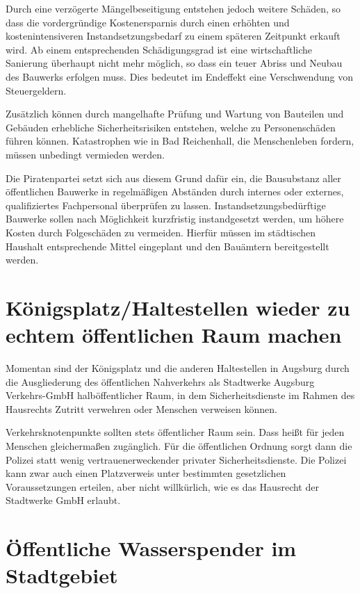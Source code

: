   Durch eine verzögerte Mängelbeseitigung entstehen jedoch weitere Schäden, so 
  dass die vordergründige Kostenersparnis durch einen erhöhten und 
  kostenintensiveren Instandsetzungsbedarf zu einem späteren Zeitpunkt erkauft 
  wird. Ab einem entsprechenden Schädigungsgrad ist eine wirtschaftliche 
  Sanierung überhaupt nicht mehr möglich, so dass ein teuer Abriss und Neubau 
  des Bauwerks erfolgen muss. Dies bedeutet im Endeffekt eine Verschwendung 
  von Steuergeldern.
  
  Zusätzlich können durch mangelhafte Prüfung und Wartung von Bauteilen und 
  Gebäuden erhebliche Sicherheitsrisiken entstehen, welche zu Personenschäden 
  führen können. Katastrophen wie in Bad Reichenhall, die Menschenleben 
  fordern, müssen unbedingt vermieden werden.
  
  Die Piratenpartei setzt sich aus diesem Grund dafür ein, die Bausubstanz 
  aller öffentlichen Bauwerke in regelmäßigen Abständen durch internes oder 
  externes, qualifiziertes Fachpersonal überprüfen zu lassen. 
  Instandsetzungsbedürftige Bauwerke sollen nach Möglichkeit kurzfristig 
  instandgesetzt werden, um höhere Kosten durch Folgeschäden zu vermeiden. 
  Hierfür müssen im städtischen Haushalt entsprechende Mittel eingeplant und 
  den Bauämtern bereitgestellt werden.
  
  \section{Königsplatz/Haltestellen wieder zu echtem öffentlichen Raum machen}
  
  Momentan sind der Königsplatz und die anderen Haltestellen in Augsburg durch 
  die Ausgliederung des öffentlichen Nahverkehrs als Stadtwerke Augsburg 
  Verkehrs-GmbH halböffentlicher Raum, in dem Sicherheitsdienste im Rahmen des 
  Hausrechts Zutritt verwehren oder Menschen verweisen können.
  
  Verkehrsknotenpunkte sollten stets öffentlicher Raum sein. Dass heißt für 
  jeden Menschen gleichermaßen zugänglich. Für die öffentlichen Ordnung sorgt 
  dann die Polizei statt wenig vertrauenerweckender privater 
  Sicherheitsdienste. Die Polizei kann zwar auch einen Platzverweis unter 
  bestimmten gesetzlichen Voraussetzungen erteilen, aber nicht willkürlich, 
  wie es das Hausrecht der Stadtwerke GmbH erlaubt.
  
  \section{Öffentliche Wasserspender im Stadtgebiet}
  

